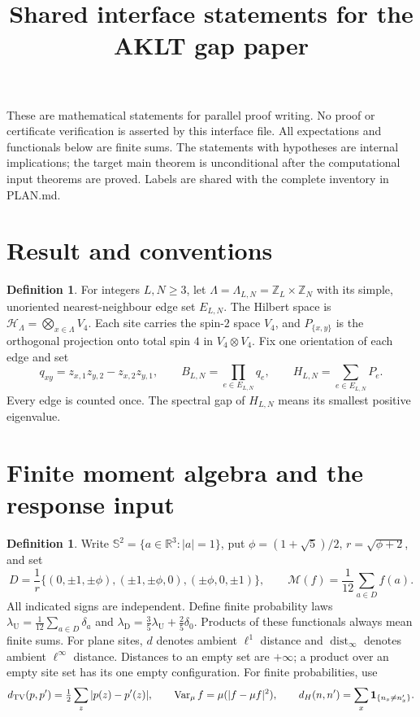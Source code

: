 \documentclass[11pt,reqno]{amsart}
\title{Shared interface statements for the AKLT gap paper}
\date{}
\theoremstyle{definition}
\newtheorem{definition}[theorem]{Definition}
\theoremstyle{remark}
\begin{document}
\maketitle
\noindent These are mathematical statements for parallel proof writing.
No proof or certificate verification is asserted by this interface file.
All expectations and functionals below are finite sums.
The statements with hypotheses are internal implications; the target
main theorem is unconditional after the computational input theorems
are proved. Labels are shared with the complete inventory in PLAN.md.




\section{Result and conventions}

\begin{definition}\label{d:model}
For integers \(L,N\ge3\), let \(\Lambda=\Lambda_{L,N}=\mathbb Z_L\times\mathbb Z_N\)
with its simple, unoriented nearest-neighbour edge set \(E_{L,N}\).
The Hilbert space is \(\mathcal H_\Lambda=\bigotimes_{x\in\Lambda}V_4\).
Each site carries the spin-\(2\) space \(V_4\), and \(P_{\{x,y\}}\)
is the orthogonal projection onto total spin \(4\) in \(V_4\otimes V_4\).
Fix one orientation of each edge and set
\[
 q_{xy}=z_{x,1}z_{y,2}-z_{x,2}z_{y,1},\qquad
 B_{L,N}=\prod_{e\in E_{L,N}}q_e,\qquad
 H_{L,N}=\sum_{e\in E_{L,N}}P_e.
\]
Every edge is counted once. The spectral gap of \(H_{L,N}\) means its
smallest positive eigenvalue.
\end{definition}


\section{Finite moment algebra and the response input}

\begin{definition}\label{d:moment}
Write \(\mathbb S^2=\{a\in\mathbb R^3:|a|=1\}\), put
\(\phi=(1+\sqrt5)/2\), \(r=\sqrt{\phi+2}\), and set
\[
 D=\frac1r\{(0,\pm1,\pm\phi),(\pm1,\pm\phi,0),(\pm\phi,0,\pm1)\},
 \qquad
 \mathcal M(f)=\frac1{12}\sum_{a\in D}f(a).
\]
All indicated signs are independent. Define finite probability laws
\(\lambda_{\mathrm U}=\frac1{12}\sum_{a\in D}\delta_a\) and
\(\lambda_{\mathrm D}=\frac35\lambda_{\mathrm U}+\frac25\delta_0\).
Products of these functionals always mean finite sums.
For plane sites, \(d\) denotes ambient \(\ell^1\) distance and
\(\operatorname{dist}_\infty\) denotes ambient \(\ell^\infty\) distance.
Distances to an empty set are \(+\infty\); a product over an empty site
set has its one empty configuration. For finite probabilities, use
\[
 d_{\rm TV}(p,p')=\tfrac12\sum_z|p(z)-p'(z)|,\qquad
 \operatorname{Var}_\mu f=\mu(|f-\mu f|^2),\qquad
 d_H(n,n')=\sum_x\mathbf1_{\{n_x\ne n'_x\}} .
\]
\end{definition}
\end{document}

